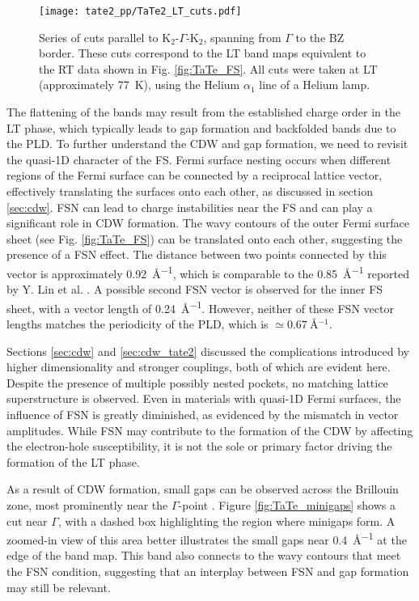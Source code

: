 \begin{figure}[h]
	\centering
	\texttt{[image: tate2\_pp/TaTe2\_LT\_cuts.pdf]}
	\caption{Series of cuts parallel to K$_2$-$\Gamma$-K$_2$, spanning from $\Gamma$ to the BZ border. These cuts correspond to the LT band maps equivalent to the RT data shown in Fig. \ref{fig:TaTe_FS}. All cuts were taken at LT (approximately \qty{77}{\kelvin}), using the Helium $\alpha_1$ line of a Helium lamp.}
	\label{fig:TaTe_LT_cuts}
\end{figure}

The flattening of the bands may result from the established charge order in the LT phase, which typically leads to gap formation and backfolded bands due to the PLD.
To further understand the CDW and gap formation, we need to revisit the quasi-1D character of the FS.
Fermi surface nesting occurs when different regions of the Fermi surface can be connected by a reciprocal lattice vector, effectively translating the surfaces onto each other, as discussed in section \ref{sec:cdw}.
FSN can lead to charge instabilities near the FS and can play a significant role in CDW formation.
The wavy contours of the outer Fermi surface sheet (see Fig. \ref{fig:TaTe_FS}) can be translated onto each other, suggesting the presence of a FSN effect.
The distance between two points connected by this vector is approximately \qty{0.92}{\angstrom^{-1}}, which is comparable to the \qty{0.85}{\angstrom^{-1}} reported by Y. Lin et al. \cite{lin_evidence_2022}.
A possible second FSN vector is observed for the inner FS sheet, with a vector length of \qty{0.24}{\angstrom^{-1}}.
However, neither of these FSN vector lengths matches the periodicity of the PLD, which is $\simeq\qty{0.67}{\angstrom^{-1}}$.

Sections \ref{sec:cdw} and \ref{sec:cdw_tate2} discussed the complications introduced by higher dimensionality and stronger couplings, both of which are evident here.
Despite the presence of multiple possibly nested pockets, no matching lattice superstructure is observed.
Even in materials with quasi-1D Fermi surfaces, the influence of FSN is greatly diminished, as evidenced by the mismatch in vector amplitudes.
While FSN may contribute to the formation of the CDW by affecting the electron-hole susceptibility, it is not the sole or primary factor driving the formation of the LT phase.

As a result of CDW formation, small gaps can be observed across the Brillouin zone, most prominently near the $\Gamma$-point \cite{lin_evidence_2022}.
Figure \ref{fig:TaTe_minigaps} shows a cut near $\Gamma$, with a dashed box highlighting the region where minigaps form.
A zoomed-in view of this area better illustrates the small gaps near \qty{0.4}{\angstrom^{-1}} at the edge of the band map.
This band also connects to the wavy contours that meet the FSN condition, suggesting that an interplay between FSN and gap formation may still be relevant.

